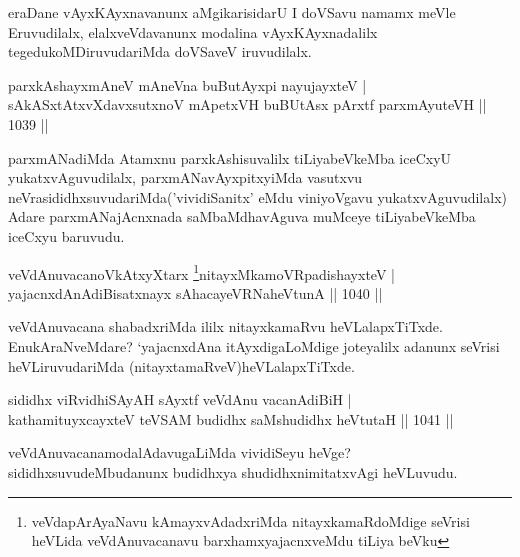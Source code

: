 \begin{artha}
eraDane vAyxKAyxnavanunx aMgikarisidarU I doVSavu namamx meVle Eruvudilalx, 
elalxveVdavanunx modalina vAyxKAyxnadalilx tegedukoMDiruvudariMda doVSaveV iruvudilalx.
\end{artha}


\begin{shl}
parxkAshayxmAneV mAneVna buButAyx\s pi nayujayxteV |\\
sAkASxtAtxvXdavxsutxnoV mApetxVH buBUtAsx pArxtf parxmAyuteVH || 1039 ||
\end{shl}

\begin{artha}
parxmANadiMda Atamxnu parxkAshisuvalilx tiLiyabeVkeMba iceCxyU yukatxvAguvudilalx, parxmANavAyxpitxyiMda vasutxvu neVrasididhxsuvudariMda('vividiSanitx' eMdu viniyoVgavu yukatxvAguvudilalx) Adare parxmANajAcnxnada saMbaMdhavAguva muMceye tiLiyabeVkeMba iceCxyu baruvudu.
\end{artha}



\begin{shl}
veVdAnuvacanoVkAtxyX\s tarx \footnote{veVdapArAyaNavu kAmayxvAdadxriMda nitayxkamaRdoMdige seVrisi heVLida 
veVdAnuvacanavu barxhamxyajacnxveMdu tiLiya beVku}nitayxMkamoVRpadishayxteV |\\
yajacnxdAnAdiBisatxnayx sAhacayeVRNaheVtunA || 1040 ||
\end{shl}

\begin{artha}
veVdAnuvacana shabadxriMda ililx nitayxkamaRvu heVLalapxTiTxde. EnukAraNveMdare? `yajacnxdAna itAyxdigaLoMdige joteyalilx adanunx seVrisi heVLiruvudariMda (nitayxtamaRveV)heVLalapxTiTxde.
\end{artha}

\begin{shl}
sididhx viRvidhiSAyAH sAyxtf veVdAnu vacanAdiBiH |\\
kathamituyxcayxteV teVSAM budidhx saMshudidhx heVtutaH || 1041 ||
\end{shl}

\begin{artha}
veVdAnuvacanamodalAdavugaLiMda vividiSeyu heVge? sididhxsuvudeMbudanunx budidhxya shudidhxnimitatxvAgi heVLuvudu.
\end{artha}

